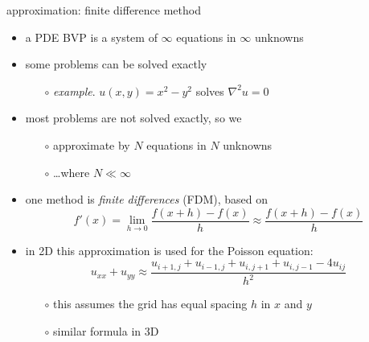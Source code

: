 \documentclass[hide notes,intlimits,usenames,dvipsnames]{beamer}
\newcommand{\grad}{\nabla}
\begin{document}
\begin{frame}{approximation: finite difference method}
\begin{itemize}
\item a PDE BVP is a system of $\infty$ equations in $\infty$ unknowns
\item some problems can be solved exactly
	\begin{itemize}
	\item[$\circ$] \emph{example}.  $u(x,y)=x^2-y^2$ solves $\grad^2 u = 0$
	\end{itemize}
\item most problems are not solved exactly, so we
	\begin{itemize}
	\item[$\circ$] \alert{approximate by $N$ equations in $N$ unknowns}
	\item[$\circ$] \dots where $N \ll \infty$
	\end{itemize}
\item one method is \emph{finite differences} (FDM), based on
	    $$f'(x) = \lim_{h \to 0} \frac{f(x+h)-f(x)}{h} \approx \frac{f(x+h)-f(x)}{h}$$
\item in 2D this approximation is used for the Poisson equation:
	    $$u_{xx}+u_{yy} \approx \frac{u_{i+1,j} + u_{i-1,j} + u_{i,j+1} + u_{i,j-1} - 4 u_{ij}}{h^2}$$
	\vspace{-4mm}
	\begin{itemize}
	\item[$\circ$] this assumes the grid has equal spacing $h$ in $x$ and $y$
	\item[$\circ$] similar formula in 3D
	\end{itemize}
\end{itemize}
\end{frame}
\end{document}
